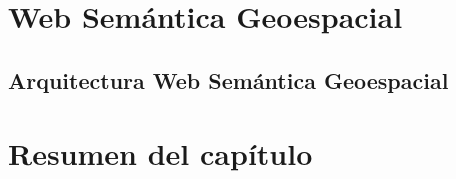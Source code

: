 \section{Web Semántica Geoespacial}


\subsection{Arquitectura Web Semántica Geoespacial}



% 


\section{Resumen del capítulo}





